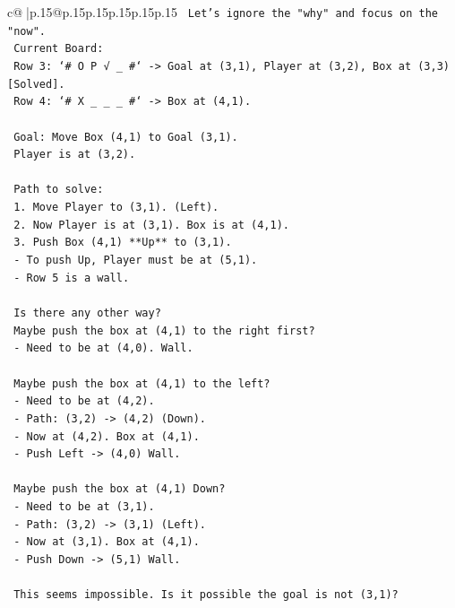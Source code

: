 \documentclass{article}
\begin{document}
{\begin{supertabular}{c@{$\;$}|p{.15\linewidth}@{}p{.15\linewidth}p{.15\linewidth}p{.15\linewidth}p{.15\linewidth}p{.15\linewidth}}
{{{\texttt{      Let's ignore the "why" and focus on the "now".} \\
\texttt{      Current Board:} \\
\texttt{      Row 3: `\# O P √ \_ \#` {-}> Goal at (3,1), Player at (3,2), Box at (3,3) {[}Solved{]}.} \\
\texttt{      Row 4: `\# X \_ \_ \_ \#` {-}> Box at (4,1).} \\
\\ 
\texttt{      Goal: Move Box (4,1) to Goal (3,1).} \\
\texttt{      Player is at (3,2).} \\
\\ 
\texttt{      Path to solve:} \\
\texttt{      1. Move Player to (3,1). (Left).} \\
\texttt{      2. Now Player is at (3,1). Box is at (4,1).} \\
\texttt{      3. Push Box (4,1) **Up** to (3,1).} \\
\texttt{         {-} To push Up, Player must be at (5,1).} \\
\texttt{         {-} Row 5 is a wall.} \\
\\ 
\texttt{      Is there any other way?} \\
\texttt{      Maybe push the box at (4,1) to the right first?} \\
\texttt{      {-} Need to be at (4,0). Wall.} \\
\\ 
\texttt{      Maybe push the box at (4,1) to the left?} \\
\texttt{      {-} Need to be at (4,2).} \\
\texttt{      {-} Path: (3,2) {-}> (4,2) (Down).} \\
\texttt{      {-} Now at (4,2). Box at (4,1).} \\
\texttt{      {-} Push Left {-}> (4,0) Wall.} \\
\\ 
\texttt{      Maybe push the box at (4,1) Down?} \\
\texttt{      {-} Need to be at (3,1).} \\
\texttt{      {-} Path: (3,2) {-}> (3,1) (Left).} \\
\texttt{      {-} Now at (3,1). Box at (4,1).} \\
\texttt{      {-} Push Down {-}> (5,1) Wall.} \\
\\ 
\texttt{      This seems impossible. Is it possible the goal is not (3,1)?} \\
}}}
\end{supertabular}}
\end{document}

